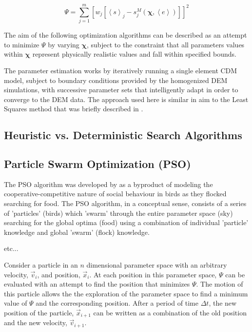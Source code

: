 \begin{equation}
\Psi=\sum_{j=1}^m\left[w_j\left[\left< s \right>_j-s^M_j \left(\boldsymbol{\chi}, \left< e \right>\right)\right]\right]^2
\label{eqn:lma2}
\end{equation}

The aim of the following optimization algorithms can be described as an attempt to minimize $\Psi$ by varying $\boldsymbol{\chi}$, subject to the constraint that all parameters values within $\boldsymbol{\chi}$ represent physically realistic values and fall within specified bounds.

The parameter estimation works by iteratively running a single element CDM model, subject to boundary conditions provided by the homogenized DEM simulations, with successive parameter sets that intelligently adapt in order to converge to the DEM data. The approach used here is similar in aim to the Least Squares method that was briefly described in \citet{marquardt_algorithm_1963}.

\subsection{Heuristic vs. Deterministic Search Algorithms}

\subsection{Particle Swarm Optimization (PSO)}

The PSO algorithm was developed by \citet{Kennedy} as a byproduct of modeling the cooperative-competitive nature of social behaviour in birds as they flocked searching for food. The PSO algorithm, in a conceptual sense, consists of a series of 'particles' (birds) which 'swarm' through the entire parameter space (sky) searching for the global optima (food) using a combination of individual 'particle' knowledge and global 'swarm' (flock) knowledge.

etc...

Consider a particle in an $n$ dimensional parameter space with an arbitrary velocity, $\vec{v}_i$, and position, $\vec{x}_i$. At each position in this parameter space, $\Psi$ can be evaluated with an attempt to find the position that minimizes $\Psi$. The motion of this particle allows the the exploration of the parameter space to find a minimum value of $\Psi$ and the corresponding position. After a period of time $\Delta t$, the new position of the particle, $\vec{x}_{i+1}$ can be written as a combination of the old position and the new velocity, $\vec{v}_{i+1}$. 

